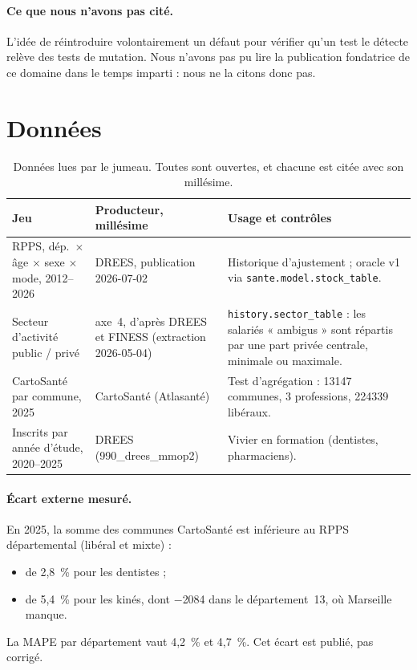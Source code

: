 \documentclass[11pt]{article}
\begin{document}
\paragraph{Ce que nous n'avons pas cité.} L'idée de réintroduire volontairement un défaut pour
vérifier qu'un test le détecte relève des tests de mutation. Nous n'avons pas pu lire la publication
fondatrice de ce domaine dans le temps imparti : nous ne la citons donc pas.

\section{Données}

\begin{table}[h]
\centering\small
\begin{tabular}{p{4.2cm}p{3.3cm}p{6.4cm}}
\toprule
Jeu & Producteur, millésime & Usage et contrôles \\
\midrule
RPPS, dép.\ $\times$ âge $\times$ sexe $\times$ mode, 2012--2026 & DREES, publication 2026-07-02 &
Historique d'ajustement ; oracle v1 via \texttt{sante.model.stock\_table}. \\
Secteur d'activité public / privé & axe~4, d'après DREES et FINESS (extraction 2026-05-04) &
\texttt{history.sector\_table} : les salariés « ambigus » sont répartis par une part privée
centrale, minimale ou maximale. \\
CartoSanté par commune, 2025 & CartoSanté (Atlasanté) &
Test d'agrégation : \num{13147}\mesure{} communes, 3 professions, \num{224339}\mesure{} libéraux. \\
Inscrits par année d'étude, 2020--2025 & DREES (990\_drees\_mmop2) &
Vivier en formation (dentistes, pharmaciens). \\
\bottomrule
\end{tabular}
\caption{Données lues par le jumeau. Toutes sont ouvertes, et chacune est citée avec son millésime.}
\end{table}

\paragraph{Écart externe mesuré.} En 2025, la somme des communes CartoSanté est inférieure au RPPS
départemental (libéral et mixte) :
\begin{itemize}
  \item de 2,8\mesure{}~\% pour les dentistes ;
  \item de 5,4\mesure{}~\% pour les kinés, dont $-$\num{2084}\mesure{} dans le département~13, où
        Marseille manque.
\end{itemize}
La MAPE par département vaut 4,2\mesure{}~\% et 4,7\mesure{}~\%. Cet écart est publié, pas corrigé.
\end{document}
